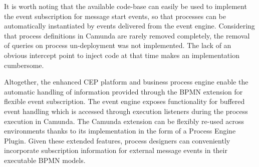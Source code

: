 It is worth noting that the available code-base can easily be used to implement the event subscription for message start events, so that processes can be automatically instantiated by events delivered from the event engine.
Considering that process definitions in Camunda are rarely removed completely, the removal of queries on process un-deployment was not implemented. The lack of an obvious intercept point to inject code at that time makes an implementation cumbersome.

\medskip \noindent
Altogether, the enhanced CEP platform and business process engine enable the automatic handling of information provided through the BPMN extension for flexible event subscription.
The event engine exposes functionality for buffered event handling which is accessed through execution listeners during the process execution in Camunda.
The Camunda extension can be flexibly re-used across environments thanks to its implementation in the form of a Process Engine Plugin.
Given these extended features, process designers can conveniently incorporate subscription information for external message events in their executable BPMN models.



